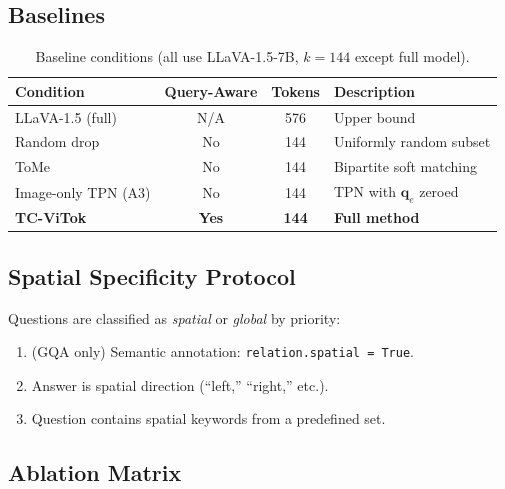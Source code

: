 \documentclass[11pt,a4paper]{article}
\newcommand{\qe}{\mathbf{q}_e}
\begin{document}
\subsection{Baselines}

\begin{table}[h]
\centering
\caption{Baseline conditions (all use LLaVA-1.5-7B, $k{=}144$ except
full model).}
\label{tab:baselines}
\renewcommand{\arraystretch}{1.15}
\small
\begin{tabular}{@{}lccp{5cm}@{}}
  \toprule
  Condition & Query-Aware & Tokens & Description \\
  \midrule
  LLaVA-1.5 (full) & N/A & 576 & Upper bound \\
  Random drop & No & 144 & Uniformly random subset \\
  ToMe & No & 144 & Bipartite soft matching \\
  Image-only TPN (A3) & No & 144 & TPN with $\qe$ zeroed \\
  \textbf{TC-ViTok} & \textbf{Yes} & \textbf{144} & \textbf{Full method} \\
  \bottomrule
\end{tabular}
\end{table}

\subsection{Spatial Specificity Protocol}

Questions are classified as \emph{spatial} or \emph{global} by priority:
\begin{enumerate}[leftmargin=1.5em, itemsep=1pt]
  \item (GQA only) Semantic annotation: \texttt{relation.spatial = True}.
  \item Answer is spatial direction (``left,'' ``right,'' etc.).
  \item Question contains spatial keywords from a predefined set.
\end{enumerate}

\subsection{Ablation Matrix}
\end{document}
